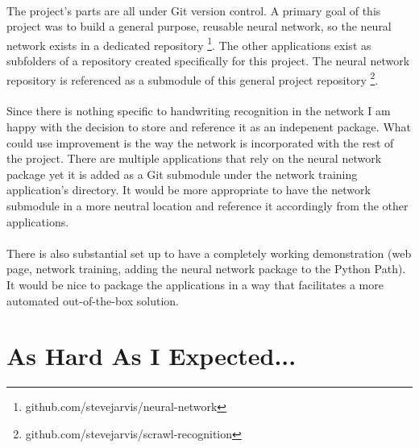 \documentclass{article}
\begin{document}
    \paragraph{}The project's parts are all under Git version control. A primary 
    goal of this project was to build a general purpose, reusable neural network, 
    so the neural network exists in a dedicated repository
    \footnote{github.com/stevejarvis/neural-network}. The other applications exist
    as subfolders of a repository created specifically for this project. The
    neural network repository is referenced as a submodule of this general 
    project repository
    \footnote{github.com/stevejarvis/scrawl-recognition}.

    \paragraph{}Since there is nothing specific to handwriting recognition in the
    network I am happy with the decision to store and reference it as an 
    indepenent package. What could use improvement is the way the network is 
    incorporated with the rest of the project. There are multiple applications 
    that rely on the neural network package yet it is added as a Git submodule 
    under the network training application's directory. It would be more 
    appropriate to have the network submodule in a more neutral location and
    reference it accordingly from the other applications. 
    
    \paragraph{}There is also substantial set up to have a completely working
    demonstration (web page, network training, adding the neural network package
    to the Python Path). It would be nice to package the applications in a way 
    that facilitates a more automated out-of-the-box solution.

\section{As Hard As I Expected...}
\end{document}
